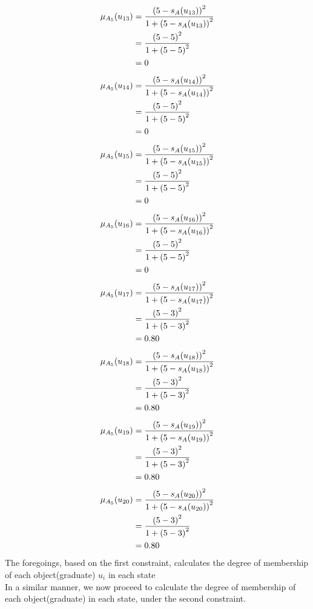 \documentclass[a4paper,openany]{book}
\begin{document}
				\begin{align}
					\mu_{A_5}(u_{13}) &= \frac{\left(5-s_A(u_{13})\right)^2}{1 + \left(5-s_A(u_{13})\right)^2}\\
					&= \frac{\left(5-5\right)^2}{1 + \left(5-5\right)^2} \notag \\
					&= 0 \notag
				\end{align}
				\begin{align}
					\mu_{A_5}(u_{14}) &= \frac{\left(5-s_A(u_{14})\right)^2}{1 + \left(5-s_A(u_{14})\right)^2}\\
					&= \frac{\left(5-5\right)^2}{1 + \left(5-5\right)^2} \notag \\
					&= 0 \notag
				\end{align}
				\begin{align}
					\mu_{A_5}(u_{15}) &= \frac{\left(5-s_A(u_{15})\right)^2}{1 + \left(5-s_A(u_{15})\right)^2}\\
					&= \frac{\left(5-5\right)^2}{1 + \left(5-5\right)^2} \notag \\
					&= 0 \notag
				\end{align}
				\begin{align}
					\mu_{A_5}(u_{16}) &= \frac{\left(5-s_A(u_{16})\right)^2}{1 + \left(5-s_A(u_{16})\right)^2}\\
					&= \frac{\left(5-5\right)^2}{1 + \left(5-5\right)^2} \notag \\
					&= 0 \notag
				\end{align}
				\begin{align}
					\mu_{A_5}(u_{17}) &= \frac{\left(5-s_A(u_{17})\right)^2}{1 + \left(5-s_A(u_{17})\right)^2}\\
					&= \frac{\left(5-3\right)^2}{1 + \left(5-3\right)^2} \notag \\
					&= 0.80 \notag
				\end{align}
				\begin{align}
					\mu_{A_5}(u_{18}) &= \frac{\left(5-s_A(u_{18})\right)^2}{1 + \left(5-s_A(u_{18})\right)^2}\\
					&= \frac{\left(5-3\right)^2}{1 + \left(5-3\right)^2} \notag \\
					&= 0.80 \notag
				\end{align}
				\begin{align}
					\mu_{A_5}(u_{19}) &= \frac{\left(5-s_A(u_{19})\right)^2}{1 + \left(5-s_A(u_{19})\right)^2}\\
					&= \frac{\left(5-3\right)^2}{1 + \left(5-3\right)^2} \notag \\
					&= 0.80 \notag
				\end{align}
				\begin{align}
					\mu_{A_5}(u_{20}) &= \frac{\left(5-s_A(u_{20})\right)^2}{1 + \left(5-s_A(u_{20})\right)^2}\\
					&= \frac{\left(5-3\right)^2}{1 + \left(5-3\right)^2} \notag \\
					&= 0.80 \notag
				\end{align}
			The foregoings, based on the first constraint, calculates the degree of membership of each object(graduate) $u_i$ in each state
			\\
			In a similar manner, we now proceed to calculate the degree of membership of each object(graduate) in each state, under the second constraint.
\end{document}
